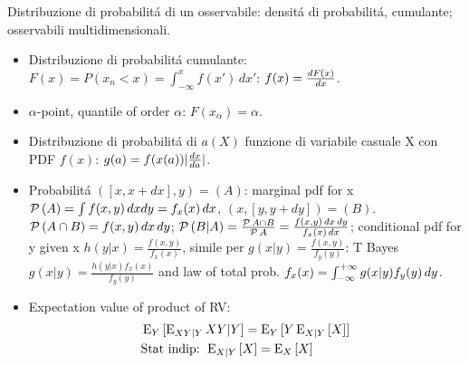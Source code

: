 \begin{frame}{Distribuzione di probabilit\'a di un osservabile: densit\'a di probabilit\'a, cumulante; osservabili multidimensionali.}
\begin{itemize}
\item Distribuzione di probabilit\'a cumulante: $F(x)=P(x_n<x)=\int_{-\infty}^xf(x')\,dx'$: $f(x)=\TDy{x}{F(x)}$.
\item $\alpha$-point, quantile of order $\alpha$: $F(x_{\alpha})=\alpha$.
\item Distribuzione di probabilit\'a di $a(X)$ funzione di variabile casuale X con PDF $f(x)$: $g(a)=f(x(a))|\TDy{a}{x}|$.
\item Probabilit\'a $([x,x+dx],y)=(A)$: marginal pdf for x $\prob{(A)}=\int f(x,y)\,dxdy=f_x(x)\,dx$, $(x,[y,y+dy])=(B)$.
$\prob{(A\cap B)}=f(x,y)\,dx\,dy$; $\prob{(B|A)}=\frac{\prob{A\cap B}}{\prob{A}}=\frac{f(x,y)\,dx\,dy}{f_x(x)\,dx}$; conditional pdf for y given x $h(y|x)=\frac{f(x,y)}{f_x(x)}$, simile per $g(x|y)=\frac{f(x,y)}{f_y(y)}$: T Bayes $g(x|y)=\frac{h(y|x)f_x(x)}{f_y(y)}$ and law of total prob. $f_x(x)=\intsinf{}g(x|y)f_y(y)\,dy$.
\item Expectation value of product of RV:%
\begin{align*}
&\E_Y{[\E_{XY|Y}{XY|Y}]}=\E_Y{[Y\E_{X|Y}{[X]}]}\\
&\text{Stat indip: }\E_{X|Y}{[X]}=\E_X{[X]}
\end{align*}
\end{itemize}
\end{frame}

